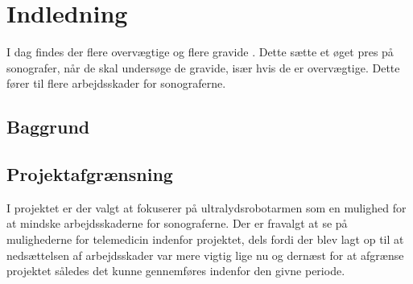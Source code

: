 \chapter{Indledning} 
I dag findes der flere overvægtige \cite{Overvaegt} og flere gravide \cite{Foedsler}. Dette sætte et øget pres på sonografer, når de skal undersøge de gravide, især hvis de er overvægtige. Dette fører til flere arbejdsskader for sonograferne. 

\section{Baggrund}

\section{Projektafgrænsning}
I projektet er der valgt at fokuserer på ultralydsrobotarmen som en mulighed for at mindske arbejdsskaderne for sonograferne. Der er fravalgt at se på mulighederne for telemedicin indenfor projektet, dels fordi der blev lagt op til at nedsættelsen af arbejdsskader var mere vigtig lige nu og dernæst for at afgrænse projektet således det kunne gennemføres indenfor den givne periode. 

\label{version_Systemark}
